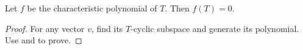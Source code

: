 \begin{theorem}
    Let $f$ be the characteristic polynomial of $T$. Then $f(T) = 0$.
\end{theorem}
\begin{proof}
    For any vector $v$, find its $T$-cyclic subspace and generate its polynomial. Use  and  to prove.
\end{proof}












































